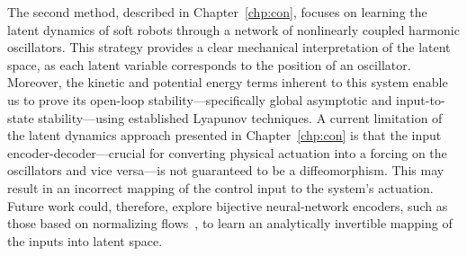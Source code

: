 The second method, described in Chapter~\ref{chp:con}, focuses on learning the latent dynamics of soft robots through a network of nonlinearly coupled harmonic oscillators. This strategy provides a clear mechanical interpretation of the latent space, as each latent variable corresponds to the position of an oscillator. Moreover, the kinetic and potential energy terms inherent to this system enable us to prove its open-loop stability—specifically global asymptotic and input-to-state stability—using established Lyapunov techniques.
A current limitation of the latent dynamics approach presented in Chapter~\ref{chp:con} is that the input encoder-decoder—crucial for converting physical actuation into a forcing on the oscillators and vice versa—is not guaranteed to be a diffeomorphism. This may result in an incorrect mapping of the control input to the system’s actuation. Future work could, therefore, explore bijective neural-network encoders, such as those based on normalizing flows~\citep{kobyzev2020normalizing}, to learn an analytically invertible mapping of the inputs into latent space.

